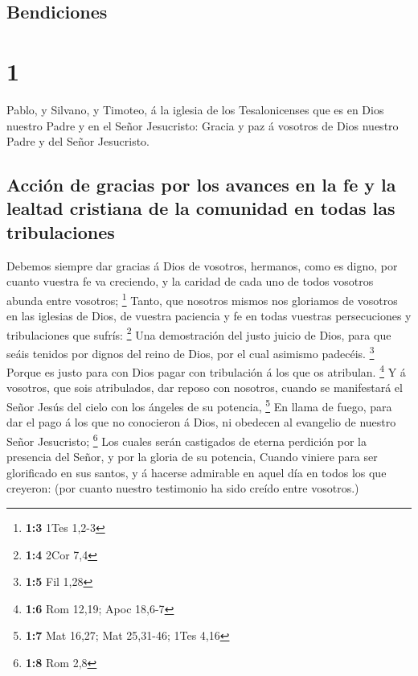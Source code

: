 \hypertarget{bendiciones}{%
\subsection{Bendiciones}\label{bendiciones}}

\hypertarget{section}{%
\section{1}\label{section}}

 Pablo, y Silvano, y Timoteo, á la iglesia de los
Tesalonicenses que es en Dios nuestro Padre y en el Señor Jesucristo:
 Gracia y paz á vosotros de Dios nuestro Padre y del Señor
Jesucristo.

\hypertarget{acciuxf3n-de-gracias-por-los-avances-en-la-fe-y-la-lealtad-cristiana-de-la-comunidad-en-todas-las-tribulaciones}{%
\subsection{Acción de gracias por los avances en la fe y la lealtad
cristiana de la comunidad en todas las
tribulaciones}\label{acciuxf3n-de-gracias-por-los-avances-en-la-fe-y-la-lealtad-cristiana-de-la-comunidad-en-todas-las-tribulaciones}}

 Debemos siempre dar gracias á Dios de vosotros, hermanos,
como es digno, por cuanto vuestra fe va creciendo, y la caridad de cada
uno de todos vosotros abunda entre vosotros; \footnote{\textbf{1:3} 1Tes
  1,2-3}  Tanto, que nosotros mismos nos gloriamos de
vosotros en las iglesias de Dios, de vuestra paciencia y fe en todas
vuestras persecuciones y tribulaciones que sufrís: \footnote{\textbf{1:4}
  2Cor 7,4}  Una demostración del justo juicio de Dios,
para que seáis tenidos por dignos del reino de Dios, por el cual
asimismo padecéis. \footnote{\textbf{1:5} Fil 1,28} 
Porque es justo para con Dios pagar con tribulación á los que os
atribulan. \footnote{\textbf{1:6} Rom 12,19; Apoc 18,6-7} 
Y á vosotros, que sois atribulados, dar reposo con nosotros, cuando se
manifestará el Señor Jesús del cielo con los ángeles de su potencia,
\footnote{\textbf{1:7} Mat 16,27; Mat 25,31-46; 1Tes 4,16}
 En llama de fuego, para dar el pago á los que no
conocieron á Dios, ni obedecen al evangelio de nuestro Señor Jesucristo;
\footnote{\textbf{1:8} Rom 2,8}  Los cuales serán
castigados de eterna perdición por la presencia del Señor, y por la
gloria de su potencia,  Cuando viniere para ser
glorificado en sus santos, y á hacerse admirable en aquel día en todos
los que creyeron: (por cuanto nuestro testimonio ha sido creído entre
vosotros.)

